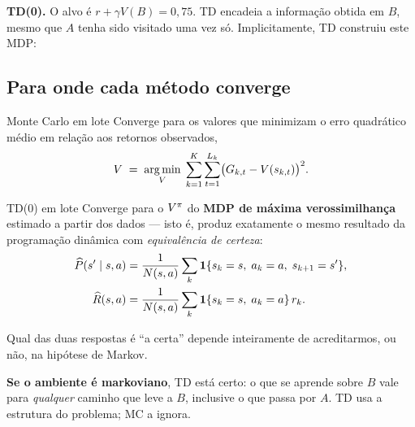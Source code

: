 \documentclass[11pt]{article}
\newcommand{\Phat}{\widehat{P}}
\newcommand{\rhat}{\widehat{\rec}}
\begin{document}
\textbf{TD(0).} O alvo é $r + \gamma V(B) = 0{,}75$. TD encadeia a informação
obtida em $B$, mesmo que $A$ tenha sido visitado uma vez só. Implicitamente, TD
construiu este MDP:

\begin{center}
\end{center}

\subsection{Para onde cada método converge}

\begin{teobox}{Monte Carlo em lote}
  Converge para os valores que minimizam o erro quadrático médio em relação aos
  retornos observados,
  \[ V \;=\; \operatorname*{arg\,min}_{V}\; \sum_{k=1}^{K}\sum_{t=1}^{L_k} \bigl(G_{k,t} - V(s_{k,t})\bigr)^2 . \]
\end{teobox}

\begin{teobox}{TD(0) em lote}
  Converge para o $V^{\pi}$ do \textbf{MDP de máxima verossimilhança} estimado a
  partir dos dados --- isto é, produz exatamente o mesmo resultado da
  programação dinâmica com \emph{equivalência de certeza}:
  \begin{align*}
    \Phat(s' \mid s,a) &= \frac{1}{N(s,a)}\sum_{k} \mathbf{1}\{s_k = s,\; a_k = a,\; s_{k+1} = s'\},\\
    \rhat(s,a) &= \frac{1}{N(s,a)}\sum_{k} \mathbf{1}\{s_k = s,\; a_k = a\}\, r_k .
  \end{align*}
\end{teobox}

Qual das duas respostas é ``a certa'' depende inteiramente de acreditarmos, ou
não, na hipótese de Markov.

\begin{ideiabox}
  \textbf{Se o ambiente é markoviano}, TD está certo: o que se aprende sobre $B$
  vale para \emph{qualquer} caminho que leve a $B$, inclusive o que passa por
  $A$. TD usa a estrutura do problema; MC a ignora.
\end{ideiabox}
\end{document}
